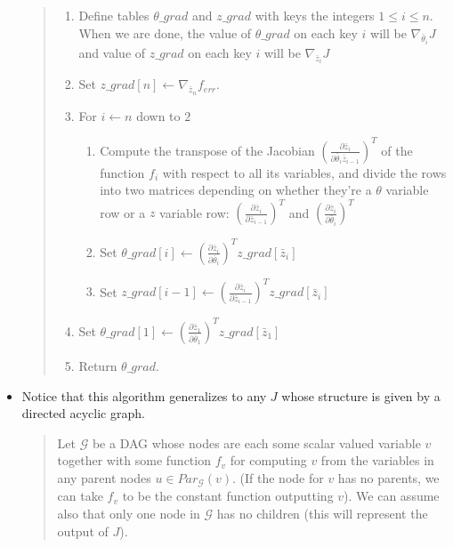 \documentclass{article}
\begin{document}
\begin{itemize}
\begin{quote}
\begin{enumerate} 
\item Define tables $\theta\_grad$ and $z\_grad$ with keys the integers $1\leq i \leq n$.
When we are done, the value of $\theta\_grad$ on each key $i$ will be $\nabla_{\bar{\theta}_{i}}J$ and value of $z\_grad$ on each key $i$ will be $\nabla_{\bar{z}_{i}}J$ 

\item  Set $z\_grad[n] \leftarrow \nabla_{\bar{z}_{n}}f_{err}.$
\item For $i \leftarrow n$ down to $2$
\begin{enumerate}
\item Compute the transpose of the Jacobian $\left(\frac{\partial \bar{z}_{i}}{\partial \bar{\theta}_{i}\bar{z}_{i-1}}\right)^{T}$ of the function $f_{i}$ with respect to all its variables, and divide the rows into two matrices depending on whether they're a $\theta$ variable row or a $z$ variable row:  $\left(\frac{\partial \bar{z}_{i}}{\partial \bar{z}_{i-1}}\right)^{T}$ and $\left(\frac{\partial \bar{z}_{i}}{\partial \bar{\theta}_{i}}\right)^{T}$
\item Set $\theta\_grad[i] \leftarrow \left(\frac{\partial \bar{z}_{i}}{\partial \bar{\theta}_{i}}\right)^{T} z\_grad[\bar{z}_{i}]$ 
\item Set $z\_grad[i-1] \leftarrow \left(\frac{\partial \bar{z}_{i}}{\partial \bar{z}_{i-1}}\right)^{T} z\_grad[\bar{z}_{i}]$ 
\end{enumerate}
\item Set $\theta\_grad[1] \leftarrow \left(\frac{\partial \bar{z}_{1}}{\partial \bar{\theta}_{1}}\right)^{T} z\_grad[\bar{z}_{1}]$ 
\item Return $\theta\_grad$.
\end{enumerate}
\end{quote}
 
 

\item Notice that this algorithm generalizes to any $J$ whose structure is given by a directed acyclic graph.  
\begin{quote} 
Let $\mathscr{G}$ be a DAG whose nodes are each some scalar valued variable $v$ together with some function $f_{v}$ for computing $v$ from the variables in any parent nodes $u \in Par_{\mathscr{G}}(v)$.  (If the node for $v$ has no parents, we can take $f_{v}$ to be the constant function outputting $v$).  We can assume also that only one node in $\mathscr{G}$ has no children (this will represent the output of $J$). 


\end{quote}
\end{itemize}
\end{document}
